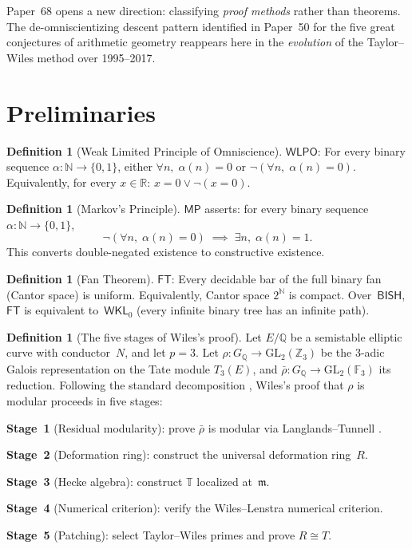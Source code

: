 \documentclass[11pt]{article}
\theoremstyle{plain}
\theoremstyle{definition}
\newtheorem{definition}[theorem]{Definition}
\theoremstyle{remark}
\newcommand{\N}{\mathbb{N}}
\newcommand{\Z}{\mathbb{Z}}
\newcommand{\Q}{\mathbb{Q}}
\newcommand{\R}{\mathbb{R}}
\newcommand{\F}{\mathbb{F}}
\newcommand{\fm}{\mathfrak{m}}
\newcommand{\GL}{\mathrm{GL}}
\newcommand{\BISH}{\mathsf{BISH}}
\newcommand{\WLPO}{\mathsf{WLPO}}
\newcommand{\MP}{\mathsf{MP}}
\newcommand{\FT}{\mathsf{FT}}
\newcommand{\WKL}{\mathsf{WKL}_0}
\begin{document}
Paper~68 opens a new direction: classifying \emph{proof methods}
rather than theorems.  The de-omniscientizing descent pattern
identified in Paper~50 for the five great conjectures of arithmetic
geometry reappears here in the \emph{evolution} of the Taylor--Wiles
method over 1995--2017.


\section{Preliminaries}\label{sec:prelim}

\begin{definition}[Weak Limited Principle of Omniscience]\label{def:wlpo}
$\WLPO$: For every binary sequence $\alpha : \N \to \{0,1\}$,
either $\forall n,\;\alpha(n) = 0$ or
$\lnot(\forall n,\;\alpha(n) = 0)$.
Equivalently, for every $x \in \R$: $x = 0 \lor \lnot(x = 0)$.
\end{definition}

\begin{definition}[Markov's Principle]\label{def:mp}
$\MP$ asserts: for every binary sequence
$\alpha\colon \N\to\{0,1\}$,
\[
  \lnot(\forall n,\;\alpha(n)=0) \;\implies\;
  \exists n,\;\alpha(n)=1.
\]
This converts double-negated existence to constructive existence.
\end{definition}

\begin{definition}[Fan Theorem]\label{def:ft}
$\FT$: Every decidable bar of the full binary fan (Cantor space) is
uniform.  Equivalently, Cantor space $2^\N$ is compact.
Over~$\BISH$, $\FT$ is equivalent to~$\WKL$ (every infinite binary
tree has an infinite path).
\end{definition}

\begin{definition}[The five stages of Wiles's proof]\label{def:stages}
Let $E/\Q$ be a semistable elliptic curve with conductor~$N$, and
let $p = 3$.  Let $\rho : G_\Q \to \GL_2(\Z_3)$ be the $3$-adic
Galois representation on the Tate module $T_3(E)$, and
$\bar{\rho} : G_\Q \to \GL_2(\F_3)$ its reduction.  Following the
standard decomposition
\cite{CSS1997, DDT1997}, Wiles's proof
that $\rho$ is modular proceeds in five stages:

\textbf{Stage~1} (Residual modularity):
prove $\bar{\rho}$ is modular via Langlands--Tunnell
\cite{Langlands1980, Tunnell1981}.

\textbf{Stage~2} (Deformation ring):
construct the universal deformation ring~$R$.

\textbf{Stage~3} (Hecke algebra):
construct $\mathbb{T}$ localized at~$\fm$.

\textbf{Stage~4} (Numerical criterion):
verify the Wiles--Lenstra numerical criterion.

\textbf{Stage~5} (Patching):
select Taylor--Wiles primes and prove $R \cong T$.
\end{definition}
\end{document}
